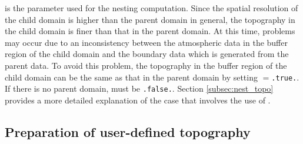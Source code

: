  is the parameter used for the nesting computation.
Since the spatial resolution of the child domain is higher than the parent domain in general,
the topography in the child domain is finer than that in the parent domain.
At this time, problems may occur due to an inconsistency between the atmospheric data in the buffer region of the child domain and the boundary data which is generated from the parent data.
To avoid this problem, the topography in the buffer region of the child domain can be the same as that in the parent domain by setting $=$\verb|.true.|.
If there is no parent domain,  must be \verb|.false.|.
Section \ref{subsec:nest_topo} provides a more detailed explanation of the case that involves the use of .



\subsection{Preparation of user-defined topography} \label{subsec:topo_userfile}


